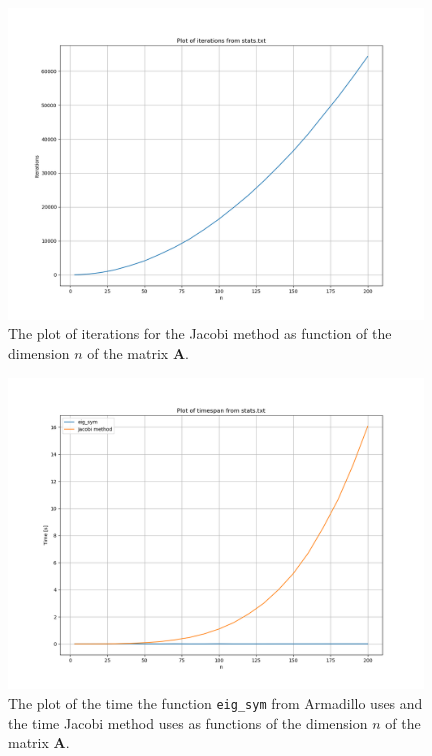\documentclass{article}
\begin{document}
  \begin{figure}[ht]
  	\centering
    \includegraphics[width = 11cm]{iterations-stats.png}
  	\caption{The plot of iterations for the Jacobi method as function of the dimension $n$ of the matrix \textbf{A}. }
    \label{fig:iterationspng}
  \end{figure}

  \begin{figure}[ht]
    \centering
    \includegraphics[width = 11cm]{timespan-stats.png}
    \caption{The plot of the time the function \texttt{eig\_sym} from Armadillo uses and the time Jacobi method uses as functions of the dimension $n$ of the matrix \textbf{A}. }
    \label{fig:timespanpng}
  \end{figure}
\end{document}

